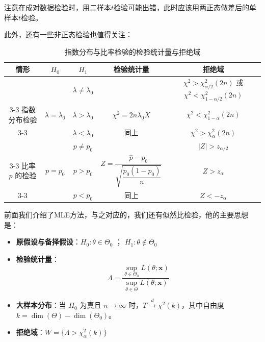 \documentclass[a4paper]{ctexart}
\begin{document}
\begin{tipbox}
    注意在成对数据检验时，用二样本$t$检验可能出错，此时应该用两正态做差后的单样本$t$检验。
\end{tipbox}

此外，还有一些非正态检验也值得关注：

\begin{table}[H] %
\centering
\renewcommand{\arraystretch}{1.35} %
\caption{指数分布与比率检验的检验统计量与拒绝域}
\begin{tabular}{|c|c|c|c|c|}
\hline
\textbf{情形} & $H_0$ & $H_1$ & \textbf{检验统计量} & \textbf{拒绝域} \\ \hline
& & $\lambda \neq \lambda_0$ & & $\chi^2 > \chi^2_{\alpha/2}(2n)$ 或 $\chi^2 < \chi^2_{1-\alpha/2}(2n)$ \\ \cline{3-3} \cline{5-5}
指数分布检验 & $\lambda = \lambda_0$ & $\lambda > \lambda_0$ & $\chi^2 = 2n\lambda_0 \bar{X}$ & $\chi^2 < \chi^2_{1-\alpha}(2n)$ \\ \cline{3-3} \cline{5-5}
& & $\lambda < \lambda_0$ & 同上 & $\chi^2 > \chi^2_{\alpha}(2n)$ \\ \hline
& & $p \neq p_0$ & & $|Z| > z_{\alpha/2}$ \\ \cline{3-3} \cline{5-5}
比率 $p$ 的检验 & $p = p_0$ & $p > p_0$ & $Z = \dfrac{\hat{p} - p_0}{\sqrt{\dfrac{p_0(1-p_0)}{n}}}$ & $Z > z_{\alpha}$ \\ \cline{3-3} \cline{5-5}
& & $p < p_0$ & 同上 & $Z < -z_{\alpha}$ \\ \hline
\end{tabular}
\end{table}

前面我们介绍了MLE方法，与之对应的，我们还有似然比检验，他的主要思想是：
\begin{itemize}
    \item \textbf{原假设与备择假设}：$H_0: \theta \in \Theta_0$ ； $H_1: \theta \notin \Theta_0$
    \item \textbf{检验统计量}：
    \[ \Lambda =  \frac{\sup_{\theta \in \Theta_0} L(\theta; \bm{x})}{\sup_{\theta \in \Theta} L(\theta; \bm{x})} \]
    \item \textbf{大样本分布}：当 $H_0$ 为真且 $n \to \infty$ 时，$T \xrightarrow{d} \chi^2(k)$，其中自由度 $k = \dim(\Theta) - \dim(\Theta_0)$。
    \item \textbf{拒绝域}：$W = \{ \Lambda > \chi^2_{\alpha}(k) \}$
\end{itemize}
\end{document}
